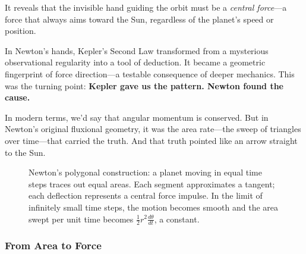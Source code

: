 It reveals that the invisible hand guiding the orbit must be a \textit{central force}—a force that always aims toward the Sun, regardless of the planet’s speed or position.

In Newton’s hands, Kepler’s Second Law transformed from a mysterious observational regularity into a tool of deduction. It became a geometric fingerprint of force direction—a testable consequence of deeper mechanics.
This was the turning point:
\textbf{Kepler gave us the pattern. Newton found the cause.}

In modern terms, we’d say that angular momentum is conserved. But in Newton’s original fluxional geometry, it was the area rate—the sweep of triangles over time—that carried the truth.
And that truth pointed like an arrow straight to the Sun.

\begin{figure}[H]
\centering
{}
\caption{Newton’s polygonal construction: a planet moving in equal time steps traces out equal areas. Each segment approximates a tangent; each deflection represents a central force impulse. In the limit of infinitely small time steps, the motion becomes smooth and the area swept per unit time becomes \( \frac{1}{2} r^2 \frac{d\theta}{dt} \), a constant.}
\end{figure}

\subsubsection{From Area to Force} 

